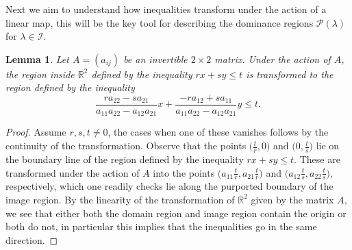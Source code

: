 \documentclass{amsart}
\newtheorem{lemma}[theorem]{Lemma}
\numberwithin{theorem}{section}
\newcommand{\cI}{\mathcal{I}}
\newcommand{\cP}{\mathcal{P}}
\newcommand{\RR}{\mathbb{R}}
\begin{document}
  Next we aim to understand how inequalities transform under the action of a linear map, this will be the key tool for describing the dominance regions $\cP(\lambda)$ for $\lambda\in\cI$.
  \begin{lemma}
    \label{le:transformed inequalities}
    Let $A=(a_{ij})$ be an invertible $2\times 2$ matrix.
    Under the action of $A$, the region inside $\RR^2$ defined by the inequality $rx+sy\le t$ is transformed to the region defined by the inequality \[\frac{ra_{22}-sa_{21}}{a_{11}a_{22}-a_{12}a_{21}}x + \frac{-ra_{12}+sa_{11}}{a_{11}a_{22}-a_{12}a_{21}}y\le t.\]
  \end{lemma}
  \begin{proof}
    Assume $r,s,t\ne0$, the cases when one of these vanishes follows by the continuity of the transformation.
    Observe that the points $\big(\frac{t}{r},0\big)$ and $\big(0,\frac{t}{s}\big)$ lie on the boundary line of the region defined by the inequality $rx+sy\le t$.
    These are transformed under the action of $A$ into the points $\big(a_{11}\frac{t}{r},a_{21}\frac{t}{r}\big)$ and $\big(a_{12}\frac{t}{s},a_{22}\frac{t}{s}\big)$, respectively, which one readily checks lie along the purported boundary of the image region.
    By the linearity of the transformation of $\RR^2$ given by the matrix $A$, we see that either both the domain region and image region contain the origin or both do not, in particular this implies that the inequalities go in the same direction.
  \end{proof}
  
\end{document}
